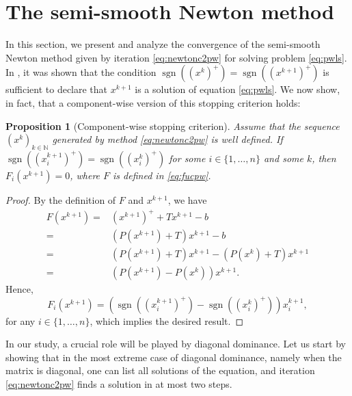 \documentclass[11pt]{article}
\newtheorem{proposition}{Proposition}[section]
\DeclareMathOperator{\sgn}{sgn}
\newcommand{\NN}{\mathbb{N}}
\begin{document}
\section{The semi-smooth Newton method} \label{sec: defscls}


In this section, we present and analyze the convergence of the semi-smooth Newton method given by iteration \eqref{eq:newtonc2pw} for solving problem \eqref{eq:pwls}. In \cite{Barrios:2016,Brugnano:2009}, it was shown that the condition $\sgn((x^{k})^+) = \sgn((x^{k+1})^+)$ is sufficient to declare that $x^{k+1}$ is a solution of equation \eqref{eq:pwls}. We now show, in fact, that a component-wise version of this stopping criterion holds:


\begin{proposition}[Component-wise stopping criterion]\label{gen_pk=pk+1}
Assume that the sequence $(x^k)_{k\in\NN}$ generated by method \eqref{eq:newtonc2pw} is well defined. If $\sgn((x^{k+1}_i)^+) = \sgn((x^{k}_i)^+)$ for some $i \in \{1,\dots,n\}$ and some $k$, then $F_i(x^{k+1}) = 0$, where $F$ is defined in \eqref{eq:fucpw}.
\end{proposition}

\begin{proof}
By the definition of $F$ and $x^{k+1}$, we have
\begin{align*}
F(x^{k+1}) = & (x^{k+1})^+ + Tx^{k+1} - b \\
= & (P(x^{k+1})+T)x^{k+1} - b\\
= & (P(x^{k+1})+T)x^{k+1} - (P(x^{k})+T)x^{k+1}\\
= & (P(x^{k+1})-P(x^{k}))x^{k+1}.
\end{align*} Hence,
\begin{equation} \label{F_sgn_eq}
F_i(x^{k+1}) = \left(\sgn((x^{k+1}_i)^+)-\sgn((x^{k}_i)^+)\right)x^{k+1}_i,
\end{equation} for any $i \in \{1,\dots,n\}$, which implies the desired result.
\end{proof}

In our study, a crucial role will be played by diagonal dominance. Let us start by showing that in the most extreme case of diagonal dominance, namely when the matrix is diagonal, one can list all solutions of the equation, and iteration \eqref{eq:newtonc2pw} finds a solution in at most two steps.
\end{document}
